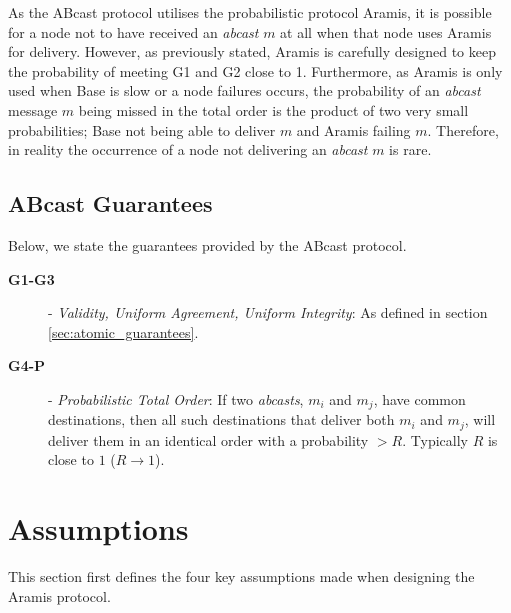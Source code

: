 As the \textsf{ABcast} protocol utilises the probabilistic protocol \textsf{Aramis}, it is possible for a node not to have received an \emph{abcast} $m$ at all when that node uses \textsf{Aramis} for delivery.  However, as previously stated, \textsf{Aramis} is carefully designed to keep the probability of meeting G1 and G2 close to 1.  Furthermore, as \textsf{Aramis} is only used when \textsf{Base} is slow or a node failures occurs, the probability of an \emph{abcast} message $m$ being missed in the total order is the product of two very small probabilities; \textsf{Base} not being able to deliver $m$ and \textsf{Aramis} failing $m$.  Therefore, in reality the occurrence of a node not delivering an \emph{abcast} $m$ is rare.   

\newpage
    \subsection{ABcast Guarantees}
    Below, we state the guarantees provided by the \textsf{ABcast} protocol.  
   
    \begin{description}
    \item [\textbf{G1-G3}] - \emph{Validity, Uniform Agreement, Uniform Integrity}: As defined in section \ref{sec:atomic_guarantees}.
    \item [\textbf{G4-P}] - \emph{Probabilistic Total Order}: If two \emph{\emph{abcast}s}, $m_i$ and $m_j$, have common destinations, then all such destinations that deliver both $m_i$ and $m_j$, will deliver them in an identical order with a probability $> R$.  Typically $R$ is close to $1$ ($R \rightarrow 1$).
\end{description}

\section{Assumptions}
    This section first defines the four key assumptions made when designing the \textsf{Aramis} protocol. 

